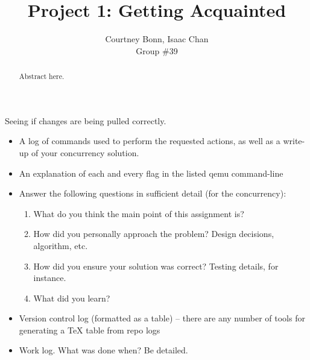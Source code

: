 \documentclass[letterpaper,10pt,draftclsnofoot,onecolumn,titlepage]{IEEEtran}
\def\name{Courtney Bonn, Isaac Chan}
\def\grp{Group \#39}
\begin{document}
\title{Project 1: Getting Acquainted}
\author{\name \\ \grp}

\maketitle

\begin{abstract}
Abstract here.
\end{abstract}

\clearpage

Seeing if changes are being pulled correctly. 

\begin{itemize}
	\item A log of commands used to perform the requested actions, as well as a write-up of your concurrency solution.
	\item An explanation of each and every flag in the listed qemu command-line
	\item Answer the following questions in sufficient detail (for the concurrency):
    \begin{enumerate}  
		\item What do you think the main point of this assignment is?
		\item How did you personally approach the problem? Design decisions, algorithm, etc.
		\item How did you ensure your solution was correct? Testing details, for instance.
		\item What did you learn?
 	\end{enumerate}
	\item Version control log (formatted as a table) -- there are any number of tools for generating a TeX table from repo logs
	\item Work log. What was done when? Be detailed.
\end{itemize}

%
\end{document}
